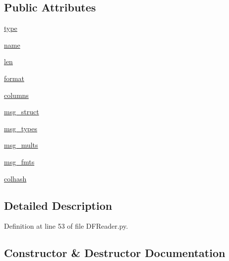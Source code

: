 \subsection*{Public Attributes}
\begin{DoxyCompactItemize}
\item 
\mbox{\hyperlink{classpymavlink_1_1DFReader_1_1DFFormat_a2b5d2f5837b6a88c5155cf0e242f740f}{type}}
\item 
\mbox{\hyperlink{classpymavlink_1_1DFReader_1_1DFFormat_ad341e8512ba46835ee1e029d4141231f}{name}}
\item 
\mbox{\hyperlink{classpymavlink_1_1DFReader_1_1DFFormat_a82a75e79f81f3c05e078851728fff0ea}{len}}
\item 
\mbox{\hyperlink{classpymavlink_1_1DFReader_1_1DFFormat_a7b229df2142b24a075c4c9d4951fb5de}{format}}
\item 
\mbox{\hyperlink{classpymavlink_1_1DFReader_1_1DFFormat_a3e7e476b92d901c1ec6460257d64a121}{columns}}
\item 
\mbox{\hyperlink{classpymavlink_1_1DFReader_1_1DFFormat_a9bc2916a84e7bf5e7ef039278545f5cf}{msg\+\_\+struct}}
\item 
\mbox{\hyperlink{classpymavlink_1_1DFReader_1_1DFFormat_a4f38e75910cecd56732509e3ae05c2a7}{msg\+\_\+types}}
\item 
\mbox{\hyperlink{classpymavlink_1_1DFReader_1_1DFFormat_a4eee14ede63ba3a5408fbd0329876b4c}{msg\+\_\+mults}}
\item 
\mbox{\hyperlink{classpymavlink_1_1DFReader_1_1DFFormat_a3a78d912c21b477498b3710546174668}{msg\+\_\+fmts}}
\item 
\mbox{\hyperlink{classpymavlink_1_1DFReader_1_1DFFormat_ad31fa0c10cafcc57757c2c5b78217600}{colhash}}
\end{DoxyCompactItemize}


\subsection{Detailed Description}


Definition at line 53 of file D\+F\+Reader.\+py.



\subsection{Constructor \& Destructor Documentation}
\mbox{\label{classpymavlink_1_1DFReader_1_1DFFormat_a624300e91dbf0a331469d34dcc70ed00}} 
